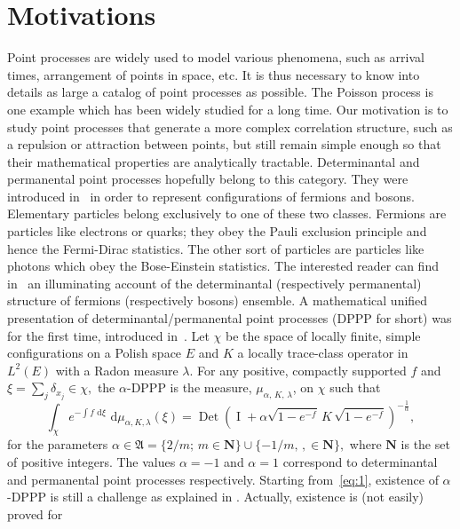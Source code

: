 \documentclass[11pt,a4paper]{amsart}
\begin{document}
\section{Motivations}
Point processes are widely used to model various phenomena, such as
arrival times, arrangement of points in space, etc. It is thus
necessary to know into details as large a catalog of point processes
as possible. The Poisson process is one example which has been widely
studied for a long time. Our motivation is to study point processes
that generate a more complex correlation structure, such as a
repulsion or attraction between points, but still remain simple enough
so that their mathematical properties are analytically tractable.
Determinantal and permanental point processes hopefully belong to this
category. They were introduced in~\cite{MR0380979} in order to
represent configurations of fermions and bosons. Elementary particles
belong exclusively to one of these two classes.  Fermions are
particles like electrons or quarks; they obey the Pauli exclusion
principle and hence the Fermi-Dirac statistics. The other sort of
particles are particles like photons which obey the Bose-Einstein
statistics. The interested reader can find in~\cite{MR2207648} an
illuminating account of the determinantal (respectively permanental)
structure of fermions (respectively bosons) ensemble.  A mathematical
unified presentation of determinantal/permanental point processes
(DPPP for short) was for the first time, introduced
in~\cite{MR2018415}. Let $\chi$ be the space of locally finite, simple
configurations on a Polish space $E$ and $K$ a locally trace-class
operator in $L^2(E)$ with a Radon measure $\lambda$. For any positive,
compactly supported $f$ and $\xi=\sum_j \delta_{x_j}\in \chi,$ the
$\alpha$-DPPP is the measure, $\mu_{\alpha,\, K, \, \lambda}$, on
$\chi$ such that
\begin{equation}\label{eq:1}
  \int_{\chi} e^{-\int f {\text{ d}}\xi }
  {\text{ d}}\mu_{\alpha,K,\lambda}(\xi) ={\operatorname{Det}} \left( {\operatorname{I}}+\alpha \sqrt{1-e^{-f}} \, K \, \sqrt{1-e^{-f}}\right)^{-\frac{1}{\alpha}},
\end{equation}
for the parameters $\alpha\in {{\mathfrak A}}=\{2/m;\, m\in {{\mathbf N}}\}\cup\{-1/m,\, ,\in
{{\mathbf N}}\},$ where ${{\mathbf N}}$ is the set of positive integers. The values
$\alpha=-1$ and $\alpha=1$ correspond to determinantal and permanental
point processes respectively. Starting from~\eqref{eq:1}, existence of
$\alpha$-DPPP is still a challenge as explained in
\cite{math.PR/0002099}. Actually, existence is (not easily) proved for
\end{document}
